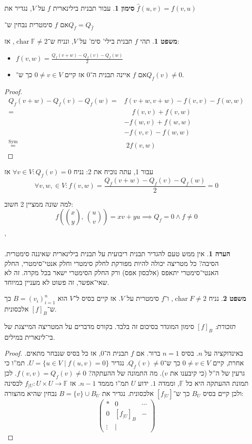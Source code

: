 \documentclass[a4paper]{article}
\newcommand\h     {\hat}
\DeclareMathOperator{\chr}     {char}
\DeclareMathOperator{\sym}     {Sym}
\newcommand\F         {\mathbb{F}}
\newcommand\co        {\colon}
\newcommand\pms[1]    {\begin{pmatrix}
		#1
\end{pmatrix}}
\theoremstyle{definition}
\newtheorem{Theorem}{משפט}
\newtheorem{Remark}{הערה}
\newtheorem{Notion}{סימון}
\newcommand\theo  [1] {\begin{Theorem}#1\end{Theorem}}
\newcommand\rmark [1] {\begin{Remark}#1\end{Remark}}
\newcommand\noti  [1] {\begin{Notion}#1\end{Notion}}
\begin{document}
	\noti{עבור תבנית בילינארית $f$ על $V$, נגדיר את $\h f(u, v) = f(v, u)$}
	אם $f$ סימטרית נבחין ש־$Q_f = Q_{\h f}$
	
	\theo{תהי $f$ תבנית בילי' סימ' על $V$, ונניח ש־$\chr \F \neq 2$, אז: 
		\begin{itemize}
			\item \hfil $f(v, w) = \frac{Q_f(v + w) - Q_f(v) - Q_f(w)}{2}$
			\item אם $f$ איינה תבנית ה־$0$ אז קיים $0 \neq v \in V$ כך ש־$Q_f(v) \neq 0$. 
	\end{itemize}}
	\begin{proof}
		\begin{align*}
			Q_f(v + w) - Q_f(v) - Q_f(w) = &f(v + w, v + w) - f(v, v) - f(w, w) \\
			= &\quad\, f(v, v) + f(v, w) \\
			&-f(w, v) + f(w, w) \\
			&-f(v, v) - f(w, w) \\
			\overset{\sym}{=} \!\!&\,\, 2f(v, w)
		\end{align*}
	\end{proof}
	עבור 1, עתה נוכיח את 2: נניח $\forall v \in V \co Q_f(v) = 0$ אז
	\[ \forall v, w, \in V \co f(v, w) = \frac{Q_f(v + w) - Q_f(v) - Q_f(w)}{2} = 0  \]
	
	למה שונה ממציין 2 חשוב: 
	\[ \textstyle f(\binom{x}{y}, \ \binom{u}{v}) = xv + yu \implies Q_f = 0 \land f \neq 0 \]
	
	'
	\rmark{אין ממש טעם להגדיר תבנית ריבועית על תבנית בילינארית שאיננה סימטרית. הסיבה? כל מטריצה יכולה להיות מפורקת לחלק סימטרי וחלק אנטי־סימטרי, החלק האנטי־סימטרי יתאפס (אלכסון אפס) ורק החלק הסימטרי ישאר בכל מקרה. זה לא שאי־אפשר, זה פשוט לא מעניין במיוחד. }
	
	\theo{נניח $\chr F \neq 2$, ו־$f$ סימטרית על $V$. אז קיים בסיס ל־$V$ הוא $B = (v_i)_{i = 1}^{n}$ כך ש־$[f]_B$ אלכסונית. }
	
	\textit{תזכורת: }$[f]_B$ סימון המוגדר בסיכום זה בלבד. בקורס מדברים על המטריצה המייצגת של בי־לינארית במילים. 
	
	\begin{proof}
		באינדוקציה על $n$. בסיס $n = 1$ ברור. אם $f$ תבנית ה־$0$, אז כל בסיס שנבחר מתאים. אחרת, קיים $0 \neq v \in V$ כך ש־$Q_f(v) \neq 0$. נגדיר $U = \{u \in V \mid f(u, v) = 0\}$. תמ''ו כי גרעין של ה''ל (כי קיבענו את $v$). מה התמונה של ההעתקה? $f(v, v) = Q_f(v) \neq 0$. לכן תמונת ההעתקה היא כל $\F$, וממדה $1$. ידוע $U$ תמ''ו מממד $n - 1$. אז $f_{|U} \co U\times U \to \F$ לכסינה ולכן קיים בסיס $B_U$ כך ש־$[f_{|U}]$ אלכסונית. נגדיר את $B = \{v\} \cup B_U$ נבחין שהיא מהצורה: 
		\[ \pms{* & 0& \cdots \\ 0 & [f_{|U}]_B& - \\ \vdots & \vert} \]
	\end{proof}
	
\end{document}
